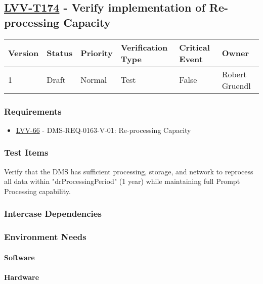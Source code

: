 \subsection{\href{https://jira.lsstcorp.org/secure/Tests.jspa\#/testCase/LVV-T174}{LVV-T174}
    - Verify implementation of Re-processing Capacity}\label{lvv-t174}

\begin{longtable}[]{llllll}
\toprule
Version & Status & Priority & Verification Type & Critical Event & Owner
\\\midrule
1 & Draft & Normal &
Test & False & Robert Gruendl
\\\bottomrule
\end{longtable}

\subsubsection{Requirements}
\begin{itemize}
\item \href{https://jira.lsstcorp.org/browse/LVV-66}{LVV-66} - DMS-REQ-0163-V-01: Re-processing Capacity
\end{itemize}

\subsubsection{Test Items}
Verify that the DMS has sufficient processing, storage, and network to
reprocess all data within "drProcessingPeriod" (1 year) while
maintaining full Prompt Processing capability.



\subsubsection{Intercase Dependencies}

\subsubsection{Environment Needs}

\paragraph{Software}

\paragraph{Hardware}

